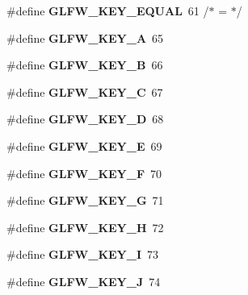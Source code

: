 \begin{DoxyCompactItemize}
\item 
\mbox{\label{group__keys_gae1a2de47240d6664423c204bdd91bd17}} 
\#define {\bfseries G\+L\+F\+W\+\_\+\+K\+E\+Y\+\_\+\+E\+Q\+U\+AL}~61  /$\ast$ = $\ast$/
\item 
\mbox{\label{group__keys_ga03e842608e1ea323370889d33b8f70ff}} 
\#define {\bfseries G\+L\+F\+W\+\_\+\+K\+E\+Y\+\_\+A}~65
\item 
\mbox{\label{group__keys_ga8e3fb647ff3aca9e8dbf14fe66332941}} 
\#define {\bfseries G\+L\+F\+W\+\_\+\+K\+E\+Y\+\_\+B}~66
\item 
\mbox{\label{group__keys_ga00ccf3475d9ee2e679480d540d554669}} 
\#define {\bfseries G\+L\+F\+W\+\_\+\+K\+E\+Y\+\_\+C}~67
\item 
\mbox{\label{group__keys_ga011f7cdc9a654da984a2506479606933}} 
\#define {\bfseries G\+L\+F\+W\+\_\+\+K\+E\+Y\+\_\+D}~68
\item 
\mbox{\label{group__keys_gabf48fcc3afbe69349df432b470c96ef2}} 
\#define {\bfseries G\+L\+F\+W\+\_\+\+K\+E\+Y\+\_\+E}~69
\item 
\mbox{\label{group__keys_ga5df402e02aca08444240058fd9b42a55}} 
\#define {\bfseries G\+L\+F\+W\+\_\+\+K\+E\+Y\+\_\+F}~70
\item 
\mbox{\label{group__keys_gae74ecddf7cc96104ab23989b1cdab536}} 
\#define {\bfseries G\+L\+F\+W\+\_\+\+K\+E\+Y\+\_\+G}~71
\item 
\mbox{\label{group__keys_gad4cc98fc8f35f015d9e2fb94bf136076}} 
\#define {\bfseries G\+L\+F\+W\+\_\+\+K\+E\+Y\+\_\+H}~72
\item 
\mbox{\label{group__keys_ga274655c8bfe39742684ca393cf8ed093}} 
\#define {\bfseries G\+L\+F\+W\+\_\+\+K\+E\+Y\+\_\+I}~73
\item 
\mbox{\label{group__keys_ga65ff2aedb129a3149ad9cb3e4159a75f}} 
\#define {\bfseries G\+L\+F\+W\+\_\+\+K\+E\+Y\+\_\+J}~74
\item 
\mbox{\label{group__keys_ga4ae8debadf6d2a691badae0b53ea3ba0}} 

\end{DoxyCompactItemize}
